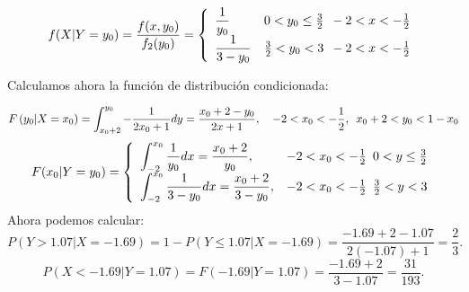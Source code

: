 \documentclass[a4paper, 11pt]{article}
\begin{document}
\[
f(X|Y=y_0)=\displaystyle\frac{f(x,y_0)}{f_2(y_0)} =\left \{ \begin{array}{ll}
\displaystyle\frac{1}{y_0} & 0 < y_0 \leq \frac{3}{2} \enskip -2 < x < -\frac{1}{2}\\
\displaystyle\frac{1}{3-y_0} & \frac{3}{2} < y_0 < 3 \enskip -2 < x < -\frac{1}{2}
\end{array}\right.
\]

Calculamos ahora la función de distribución condicionada:

\[
F\left(y_0|X=x_0\right)=\displaystyle\int_{x_0+2}^{y_0}-\displaystyle\frac{1}{2x_0+1}dy=\frac{x_0+2-y_0}{2x+1}, \quad -2<x_0<-\frac{1}{2}, \enskip x_0 + 2<y_0<1-x_0
\]
\[
F(x_0|Y=y_0) =\left \{ \begin{array}{ll}
\displaystyle\int_{-2}^{x_0}\frac{1}{y_0}dx=\frac{x_0+2}{y_0}, & -2 < x_0 < -\frac{1}{2} \enskip 0 < y \leq \frac{3}{2}\\
\displaystyle\int_{-2}^{x_0}\frac{1}{3-y_0}dx=\frac{x_0+2}{3-y_0}, & -2 < x_0 < -\frac{1}{2} \enskip \frac{3}{2} < y < 3
\end{array}\right.
\]
Ahora podemos calcular:
\[
P(Y>1.07|X=-1.69)=1-P(Y\leq 1.07|X=-1.69)=\frac{-1.69+2-1.07}{2(-1.07)+1}=\frac{2}{3}.
\]
\[
P(X<-1.69|Y=1.07)=F(-1.69|Y=1.07)=\frac{-1.69+2}{3-1.07}=\frac{31}{193}.
\]
\end{document}
